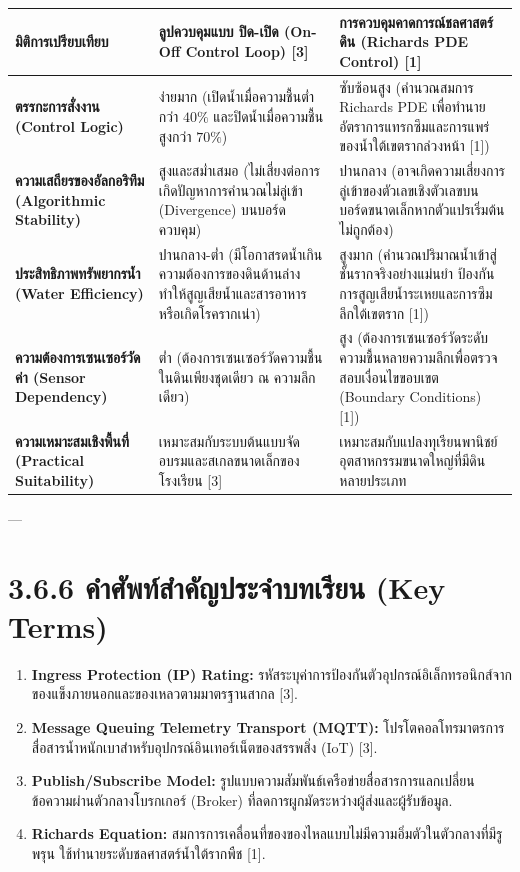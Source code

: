 \documentclass[11pt,a4paper,openany]{report}
\begin{document}
\begin{table}[htbp]
\centering
\begin{tabularx}{\textwidth}{L L L}
\toprule
มิติการเปรียบเทียบ & ลูปควบคุมแบบ ปิด-เปิด (On-Off Control Loop) [3] & การควบคุมคาดการณ์ชลศาสตร์ดิน (Richards PDE Control) [1] \\
\midrule
\textbf{ตรรกะการสั่งงาน (Control Logic)} & ง่ายมาก (เปิดน้ำเมื่อความชื้นต่ำกว่า $40\%$ และปิดน้ำเมื่อความชื้นสูงกว่า $70\%$) & ซับซ้อนสูง (คำนวณสมการ Richards PDE เพื่อทำนายอัตราการแทรกซึมและการแพร่ของน้ำใต้เขตรากล่วงหน้า [1]) \\
\textbf{ความเสถียรของอัลกอริทึม (Algorithmic Stability)} & สูงและสม่ำเสมอ (ไม่เสี่ยงต่อการเกิดปัญหาการคำนวณไม่ลู่เข้า (Divergence) บนบอร์ดควบคุม) & ปานกลาง (อาจเกิดความเสี่ยงการลู่เข้าของตัวเลขเชิงตัวเลขบนบอร์ดขนาดเล็กหากตัวแปรเริ่มต้นไม่ถูกต้อง) \\
\textbf{ประสิทธิภาพทรัพยากรน้ำ (Water Efficiency)} & ปานกลาง-ต่ำ (มีโอกาสรดน้ำเกินความต้องการของดินด้านล่าง ทำให้สูญเสียน้ำและสารอาหาร หรือเกิดโรครากเน่า) & สูงมาก (คำนวณปริมาณน้ำเข้าสู่ชั้นรากจริงอย่างแม่นยำ ป้องกันการสูญเสียน้ำระเหยและการซึมลึกใต้เขตราก [1]) \\
\textbf{ความต้องการเซนเซอร์วัดค่า (Sensor Dependency)} & ต่ำ (ต้องการเซนเซอร์วัดความชื้นในดินเพียงชุดเดียว ณ ความลึกเดียว) & สูง (ต้องการเซนเซอร์วัดระดับความชื้นหลายความลึกเพื่อตรวจสอบเงื่อนไขขอบเขต (Boundary Conditions) [1]) \\
\textbf{ความเหมาะสมเชิงพื้นที่ (Practical Suitability)} & เหมาะสมกับระบบต้นแบบจัดอบรมและสเกลขนาดเล็กของโรงเรียน [3] & เหมาะสมกับแปลงทุเรียนพานิชย์อุตสาหกรรมขนาดใหญ่ที่มีดินหลายประเภท \\
\bottomrule
\end{tabularx}
\end{table}


---

\section{3.6.6 คำศัพท์สำคัญประจำบทเรียน (Key Terms)}


\begin{enumerate}
  \item \textbf{Ingress Protection (IP) Rating:} รหัสระบุค่าการป้องกันตัวอุปกรณ์อิเล็กทรอนิกส์จากของแข็งภายนอกและของเหลวตามมาตรฐานสากล [3].
  \item \textbf{Message Queuing Telemetry Transport (MQTT):} โปรโตคอลโทรมาตรการสื่อสารน้ำหนักเบาสำหรับอุปกรณ์อินเทอร์เน็ตของสรรพสิ่ง (IoT) [3].
  \item \textbf{Publish/Subscribe Model:} รูปแบบความสัมพันธ์เครือข่ายสื่อสารการแลกเปลี่ยนข้อความผ่านตัวกลางโบรกเกอร์ (Broker) ที่ลดการผูกมัดระหว่างผู้ส่งและผู้รับข้อมูล.
  \item \textbf{Richards Equation:} สมการการเคลื่อนที่ของของไหลแบบไม่มีความอิ่มตัวในตัวกลางที่มีรูพรุน ใช้ทำนายระดับชลศาสตร์น้ำใต้รากพืช [1].
\end{enumerate}
\end{document}
